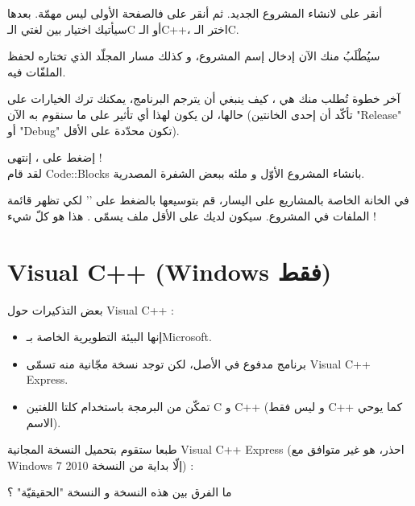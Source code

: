 أنقر على
لانشاء المشروع الجديد. ثم أنقر على
فالصفحة الأولى ليس مهمّة. بعدها سيأتيك اختيار بين لغتي الـ\textenglish{C}
أو الـ\textenglish{C++}،
اختر الـ\textenglish{C}.


سيُطْلَبُ منك الآن إدخال إسم المشروع، و كذلك مسار المجلّد الذي تختاره لحفظ الملفّات فيه.


آخر خطوة تُطلب منك هي ، كيف ينبغي أن يترجم البرنامج، يمكنك ترك الخيارات على حالها، لن يكون لهذا أي تأثير على ما سنقوم به الآن (تأكّد أن إحدى الخانتين
"\textenglish{Release}"
أو
"\textenglish{Debug}"
تكون محدّدة على الأقل).


إضغط على
،
إنتهى !\\
لقد قام
\textenglish{Code::Blocks}
بانشاء المشروع الأوّل و ملئه ببعض الشفرة المصدرية.

في الخانة الخاصة بالمشاريع على اليسار، قم بتوسيعها بالضغط على
'\InlineCode{+}'
لكي تظهر قائمة الملفات في المشروع. سيكون لديك على الأقل ملف يسمّى
.
هذا هو كلّ شيء !

\section{\textenglish{Visual C++} (\textenglish{Windows} فقط)}

بعض التذكيرات حول
Visual C++ :

\begin{itemize}
  \item إنها البيئة التطويرية الخاصة بـ\textenglish{Microsoft}.
  \item برنامج مدفوع في الأصل، لكن توجد نسخة مجّانية منه تسمّى \textenglish{Visual C++ Express}.
  \item تمكّن من البرمجة باستخدام كلتا اللغتين
\textenglish{C}
و
\textenglish{C++}
(و ليس فقط
\textenglish{C++}
كما يوحي الاسم).
\end{itemize}

طبعا ستقوم بتحميل النسخة المجانية
\textenglish{Visual C++ Express}
(احذر، هو غير متوافق مع
\textenglish{Windows 7}
إلّا بداية من النسخة 2010) :


\begin{question}
ما الفرق بين هذه النسخة و النسخة "الحقيقيّة" ؟
\end{question}

